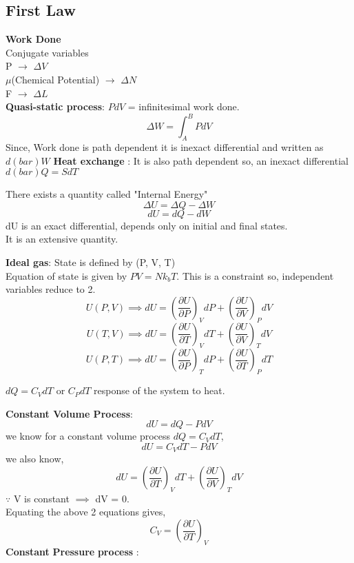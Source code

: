 \subsection{First Law}
\textbf{Work Done}\\
Conjugate variables\\
P \(\to\) \(\Delta V\) \\
\(\mu\)(Chemical Potential) \(\to \) \(\Delta N\)  \\
F \(\to \) \(\Delta L\)  \\
\textbf{Quasi-static process}: \( PdV \) = infinitesimal work done.
\[
    \Delta W = \int _{A}^{B} P dV
\]
Since, Work done is path dependent it is inexact differential and written as \( d(bar)W\)
\textbf{Heat exchange} : It is also path dependent so, an inexact differential \(d(bar)Q = SdT\) 
\begin{definition}
    There exists a quantity called "Internal Energy" 
    \[
        \Delta U = \Delta Q - \Delta W
    \]
    \[
        dU = dQ - dW
    \]
    dU is an exact differential, depends only on initial and final states. \\
    It is an extensive quantity.\\
\end{definition}
\textbf{Ideal gas}: State is defined by (P, V, T) \\
Equation of state is given by \(P V = N k_{b} T\). This is a constraint so, independent variables reduce to 2.
\[
    U(P,V)\implies 
    dU = \left(\frac{\partial U}{\partial P}\right)_{V} dP + \left(\frac{\partial U}{\partial V}\right)_{P} dV
\]
\[
    U(T,V)\implies 
    dU = \left(\frac{\partial U}{\partial T}\right)_{V} dT + \left(\frac{\partial U}{\partial V}\right)_{T} dV
\]
\[
    U(P,T)\implies 
    dU = \left(\frac{\partial U}{\partial P}\right)_{T} dP + \left(\frac{\partial U}{\partial T}\right)_{P} dT
\]
\begin{definition}
   \(dQ = C_{V} dT\) or \(C_{P} dT\)  
   response of the system to heat.
\end{definition}
\textbf{Constant Volume Process}: 
\[
    dU = dQ - PdV
\]
we know for a constant volume process \(dQ = C_{V} dT\),
\[
    dU = C_{V} dT - PdV
\]
we also know, 
\[
    dU = \left(\frac{\partial U}{\partial T}\right)_{V} dT + \left(\frac{\partial U}{\partial V}\right)_{T} dV
\]
\(\because \) V is constant \(\implies \) dV = 0.\\

Equating the above 2 equations gives, 
\[
    C_{V} = \left(\frac{\partial U}{\partial T}\right)_{V}
\]
\textbf{Constant}  \textbf{Pressure} \textbf{process} :\\

